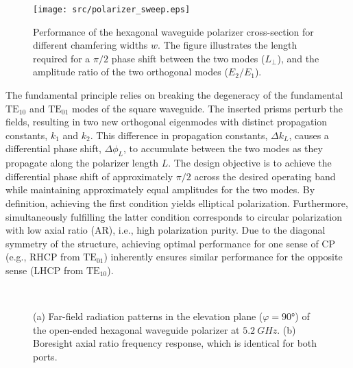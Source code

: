 \documentclass[journal]{IEEEtran}
\newcommand{\TE}[2]{\text{TE}_{#1#2}}
\begin{document}
\begin{figure}[!b]
    \centering
    \texttt{[image: src/polarizer\_sweep.eps]}
    \caption{\label{fig:polarizer-sweep}Performance of the hexagonal waveguide polarizer cross-section for different chamfering widths $w$. The figure illustrates the length required for a $\pi/2$ phase shift between the two modes ($L_\perp$), and the amplitude ratio of the two orthogonal modes ($E_2/E_1$).}
\end{figure}

The fundamental principle relies on breaking the degeneracy of the fundamental $\TE 10$ and $\TE 01$ modes of the square waveguide. The inserted prisms perturb the fields, resulting in two new orthogonal eigenmodes with distinct propagation constants, $k_1$ and $k_2$. This difference in propagation constants, $\Delta k_L$, causes a differential phase shift, $\Delta\phi_L$, to accumulate between the two modes as they propagate along the polarizer length $L$. The design objective is to achieve the differential phase shift of approximately $\pi/2$ across the desired operating band while maintaining approximately equal amplitudes for the two modes. By definition, achieving the first condition yields elliptical polarization. Furthermore, simultaneously fulfilling the latter condition corresponds to circular polarization with low axial ratio (AR), i.e., high polarization purity. Due to the diagonal symmetry of the structure, achieving optimal performance for one sense of CP (e.g., RHCP from $\TE 01$) inherently ensures similar performance for the opposite sense (LHCP from $\TE 10$).

\begin{figure}[!b]
    \centering
    \\
    \caption{\label{fig:polarizer-radiation}(a) Far-field radiation patterns in the elevation plane ($\varphi=\ang{90}$) of the open-ended hexagonal waveguide polarizer at $\qty{5.2}{GHz}$. (b) Boresight axial ratio frequency response, which is identical for both ports.}
\end{figure}
\end{document}

